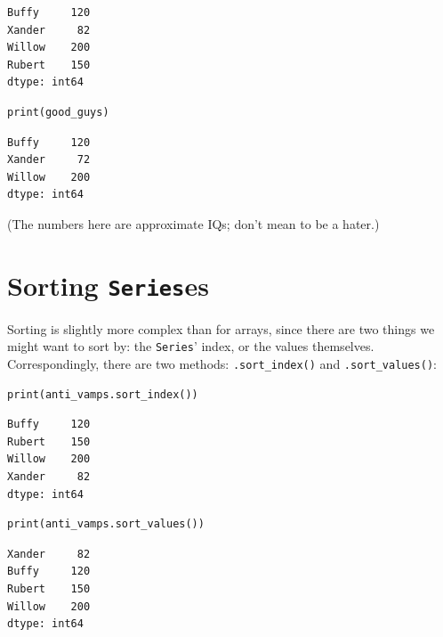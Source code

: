 \begin{Verbatim}[fontsize=\scriptsize,samepage=true,frame=leftline,framesep=5mm,framerule=1mm]
Buffy     120
Xander     82
Willow    200
Rubert    150
dtype: int64
\end{Verbatim}

\begin{Verbatim}[fontsize=\scriptsize,samepage=true,frame=single,framesep=3mm]
print(good_guys)
\end{Verbatim}
\vspace{-.3in}

\begin{Verbatim}[fontsize=\scriptsize,samepage=true,frame=leftline,framesep=5mm,framerule=1mm]
Buffy     120
Xander     72
Willow    200
dtype: int64
\end{Verbatim}

(The numbers here are approximate IQs; don't mean to be a hater.)


\section{Sorting \texttt{Series}es}

Sorting is slightly more complex than for arrays, since there are two things we
might want to sort by: the \texttt{Series}' index, or the values themselves.
Correspondingly, there are two methods: \texttt{.sort\_index()} and
\texttt{.sort\_values()}:

\begin{Verbatim}[fontsize=\small,samepage=true,frame=single,framesep=3mm]
print(anti_vamps.sort_index())
\end{Verbatim}
\vspace{-.3in}

\begin{Verbatim}[fontsize=\small,samepage=true,frame=leftline,framesep=5mm,framerule=1mm]
Buffy     120
Rubert    150
Willow    200
Xander     82
dtype: int64
\end{Verbatim}

\begin{Verbatim}[fontsize=\small,samepage=true,frame=single,framesep=3mm]
print(anti_vamps.sort_values())
\end{Verbatim}
\vspace{-.3in}

\begin{Verbatim}[fontsize=\small,samepage=true,frame=leftline,framesep=5mm,framerule=1mm]
Xander     82
Buffy     120
Rubert    150
Willow    200
dtype: int64
\end{Verbatim}

